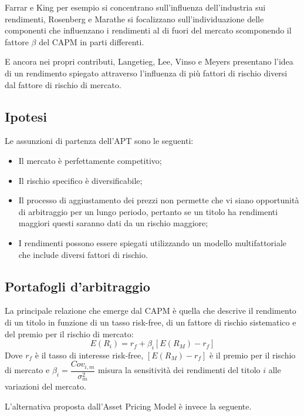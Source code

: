 Farrar e King per esempio si concentrano sull'influenza dell'industria sui rendimenti, Rosenberg e Marathe si focalizzano sull'individuazione delle componenti che influenzano i rendimenti al di fuori del mercato scomponendo il fattore $\beta$ del CAPM in parti differenti. 

E ancora nei propri contributi, Langetieg, Lee, Vinso e Meyers presentano l'idea di un rendimento spiegato attraverso l'influenza di più fattori di rischio diversi dal fattore di rischio di mercato.

\subsection{Ipotesi}
Le assunzioni di partenza dell'APT sono le seguenti:
\begin{itemize}
	\item Il mercato è perfettamente competitivo;
	\item Il rischio specifico è diversificabile;
	\item Il processo di aggiustamento dei prezzi non permette che vi siano opportunità di arbitraggio per un lungo periodo, pertanto se un titolo ha rendimenti maggiori questi saranno dati da un rischio maggiore;
	\item I rendimenti possono essere spiegati utilizzando un modello multifattoriale che include diversi fattori di rischio.
\end{itemize}

\subsection{Portafogli d'arbitraggio}

La principale relazione che emerge dal CAPM è quella che descrive il rendimento di un titolo in funzione di un tasso risk-free, di un fattore di rischio sistematico e del premio per il rischio di mercato: 
\begin{equation}
\label{SmL}
E(R_{i}) = r_{f}+\beta_{i}[E(R_{M})-r_{f}]
\end{equation}
Dove $r_{f}$ è il tasso di interesse risk-free, $[E(R_{M})-r_{f}]$ è il premio per il rischio di mercato e $\beta_{i}=\dfrac{Cov_{i,m}}{\sigma^2_{m}}$ misura la sensitività dei rendimenti del titolo $i$ alle variazioni del mercato. 

L'alternativa proposta dall'Asset Pricing Model è invece la seguente. 

